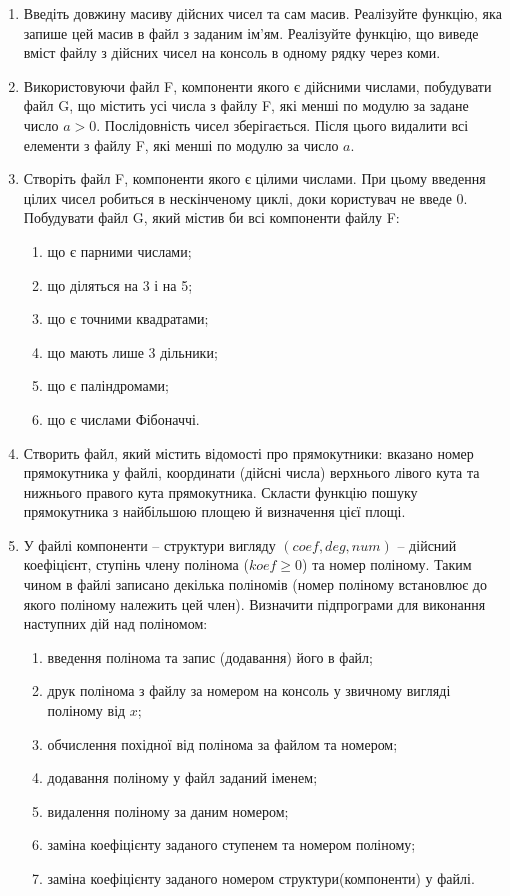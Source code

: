 \documentclass[a5paper,titlepage,openany,twoside,draft]{book_unv}%
\makeatletter
\newcommand{\xslalph}[1]{\expandafter\@xslalph\csname c@#1\endcsname}
\newcommand{\@xslalph}[1]{%
    \ifcase#1\or а\or б\or в\or г\or д\or e\or є\or ж\or з\or i%
    \or й\or к\or л\or м\or н\or о\or п\or р\or с\or т%
    \or у\or ф\or х\or ц\or ч\or ш\or ю\or я\or аа\or бб\or вв%
    \else\@ctrerr\fi%
}
\makeatother
\begin{document}
\begin{enumerate}
\def\labelenumi{\arabic{enumi})}

\item
Введіть довжину масиву дійсних чисел та сам масив. Реалізуйте функцію, яка 
запише цей масив в файл з заданим ім'ям. Реалізуйте функцію, що виведе вміст 
файлу з дійсних чисел на консоль в одному рядку через коми. 


\item
  Використовуючи файл F, компоненти якого є дійсними числами, побудувати
  файл G, що містить усі числа з файлу F, які менші по модулю за задане число $a>0$.
  Послідовність чисел зберігається. Після цього видалити всі елементи з файлу F, 
  які менші по модулю за число $a$.

\item
  Створіть файл F, компоненти якого є цілими числами. При цьому введення
цілих чисел робиться в нескінченому циклі, доки користувач не введе 0. 
 Побудувати файл G, який містив би всі компоненти файлу F:
\begin{enumerate}[label=\xslalph*)]
\item
що є парними числами; 
\item
 що діляться на 3 і на 5;
\item
що є точними квадратами; 
\item
що мають лише 3 дільники; 
\item
що є паліндромами;
\item
що є числами Фібоначчі.
\end{enumerate}


\item
  Створить файл, який містить відомості про прямокутники: вказано номер
  прямокутника у файлі, координати (дійсні числа) верхнього лівого кута та
  нижнього правого кута прямокутника. Скласти функцію пошуку
  прямокутника з найбільшою площею й визначення цієї площі.
\item
  У файлі компоненти -- структури вигляду $(coef, deg, num )$ -- 
дійсний коефіцієнт, ступінь члену полінома ($koef \ge 0$) та номер поліному. 
Таким чином в файлі записано декілька поліномів (номер поліному встановлює
до якого поліному належить цей член).
Визначити підпрограми для
  виконання наступних дій над поліномом:

\begin{enumerate}[label=\xslalph*)]
\item
введення полінома та запис (додавання) його в файл; 
\item
друк полінома з файлу за номером на консоль у звичному вигляді поліному від $x$;
\item
обчислення похідної від полінома за файлом та номером;
\item
додавання поліному у файл заданий іменем;
\item
видалення поліному за даним номером;
\item
заміна коефіцієнту заданого ступенем та номером поліному;
\item
заміна коефіцієнту заданого номером структури(компоненти) у файлі.
\end{enumerate}

\end{enumerate}
\end{document}
